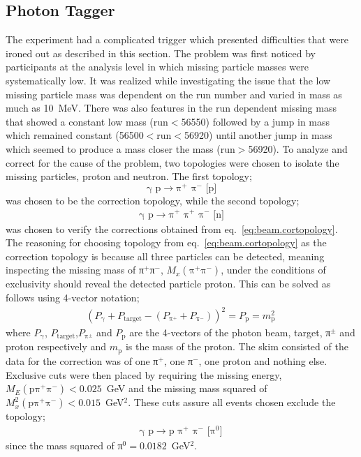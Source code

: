 \subsection{\label{sec:calib.tag}Photon Tagger}

The  experiment had a complicated trigger which presented difficulties that were ironed out as described in this section. The problem was first noticed by  participants at the analysis level in which missing particle masses were systematically low. It was realized while investigating the issue that the low missing particle mass was dependent on the run number and varied in mass as much as 10~MeV. There was also features in the run dependent missing mass that showed a constant low mass (run$<$56550) followed by a jump in mass which remained constant (56500$<$run$<$56920) until another jump in mass which seemed to produce a mass closer the  mass (run$>$56920). To analyze and correct for the cause of the problem, two topologies were chosen to isolate the missing particles, proton and neutron. The first topology;
\begin{equation}
    \text{γ p}\rightarrow\text{π$^+$ π$^-$ [p]}
    \label{eq:beam.cortopology}
\end{equation}
was chosen to be the correction topology, while the second topology;
\begin{align}
    \text{γ p}\rightarrow\text{π$^+$ π$^+$ π$^-$ [n]}
    \label{eq:beam.checktopology}
\end{align}
was chosen to verify the corrections obtained from eq.~\ref{eq:beam.cortopology}. The reasoning for choosing topology from eq.~\ref{eq:beam.cortopology} as the correction topology is because all three particles can be detected, meaning inspecting the missing mass of π$^+$π$^-$, $M_x(\text{π$^+$π$^-$})$, under the conditions of exclusivity should reveal the detected particle proton. This can be solved as follows using 4-vector notation;
\begin{align}
    (P_\text{γ} + P_\mathrm{target} - (P_\text{π$^+$} + P_\text{π$^-$}))^2 = P_\text{p} = m_\text{p}^2 \,
\end{align}
where $P_\text{γ}$, $P_\mathrm{target}$,$P_\text{π$^\pm$}$ and $P_\text{p}$ are the 4-vectors of the photon beam, target, π$^\pm$ and proton respectively and $m_\text{p}$ is the mass of the proton.
The skim consisted of the data for the correction was of one   π$^+$, one   π$^-$, one   proton and nothing else. Exclusive cuts were then placed by requiring the missing energy, $M_E(\text{pπ$^+$π$^-$}) < 0.025$~GeV and the missing mass squared of $M_x^2(\text{pπ$^+$π$^-$}) < 0.015$~GeV$^2$. These cuts assure all events chosen exclude the topology;
\begin{align}
    \text{γ p}\rightarrow\text{p π$^+$ π$^-$ [π$^0$]} \nonumber \,
\end{align}
since the mass squared of π$^0 = 0.0182$~GeV$^2$.
  
